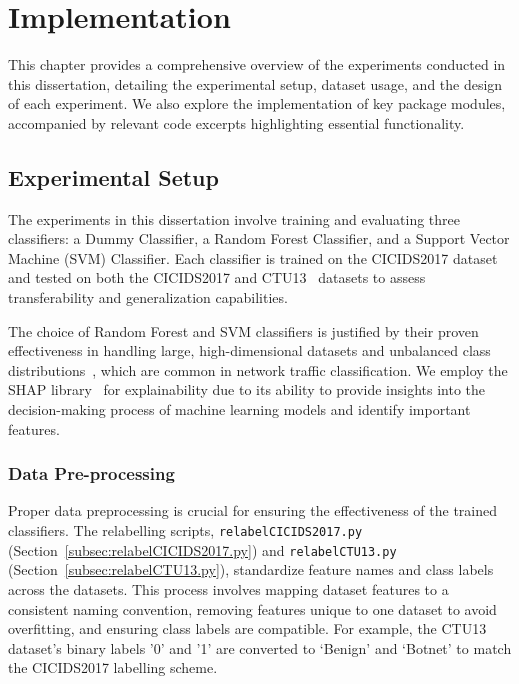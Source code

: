 \chapter{Implementation}
This chapter provides a comprehensive overview of the experiments conducted in this dissertation, detailing the experimental setup, dataset usage, and the design of each experiment. We also explore the implementation of key package modules, accompanied by relevant code excerpts highlighting essential functionality.

\section{Experimental Setup}\label{sec:experimental-setup}
The experiments in this dissertation involve training and evaluating three classifiers: a Dummy Classifier, a Random Forest Classifier, and a Support Vector Machine (SVM) Classifier. Each classifier is trained on the CICIDS2017 dataset~\cite{sharafaldin2018toward} and tested on both the CICIDS2017 and CTU13~\cite{garcia2014empirical} datasets to assess transferability and generalization capabilities.

The choice of Random Forest and SVM classifiers is justified by their proven effectiveness in handling large, high-dimensional datasets and unbalanced class distributions~\cite{farnaaz2016random, teng2017svm}, which are common in network traffic classification. We employ the SHAP library~\cite{lundberg2017unified} for explainability due to its ability to provide insights into the decision-making process of machine learning models and identify important features.

\subsection{Data Pre-processing}\label{subsec:pre-processing}
Proper data preprocessing is crucial for ensuring the effectiveness of the trained classifiers. The relabelling scripts, \texttt{relabelCICIDS2017.py} (Section~\ref{subsec:relabelCICIDS2017.py}) and \texttt{relabelCTU13.py} (Section~\ref{subsec:relabelCTU13.py}), standardize feature names and class labels across the datasets. This process involves mapping dataset features to a consistent naming convention, removing features unique to one dataset to avoid overfitting, and ensuring class labels are compatible. For example, the CTU13 dataset's binary labels '0' and '1' are converted to `Benign' and `Botnet' to match the CICIDS2017 labelling scheme.

